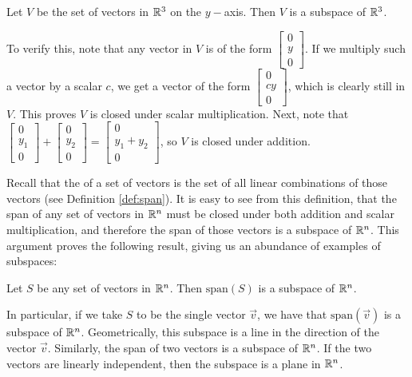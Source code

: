 \documentclass{ximera}
\begin{document}
\begin{example} \label{y-axis_subspace}
Let $V$ be the set of vectors in $\mathbb{R}^3$ on the $y-$axis.  Then $V$ is a subspace of $\mathbb{R}^3$.  

\begin{explanation}
To verify this, note that any vector in $V$ is of the form $\begin{bmatrix}0\\y\\0 \end{bmatrix}$.  If we multiply such a vector by a scalar $c$, we get a vector of the form $\begin{bmatrix}0\\cy\\0 \end{bmatrix}$, which is clearly still in $V$.  This proves $V$ is closed under scalar multiplication.  Next, note that $\begin{bmatrix}0\\y_1\\0 \end{bmatrix} + \begin{bmatrix}0\\y_2\\0 \end{bmatrix}= \begin{bmatrix}0\\y_1 + y_2\\0\end{bmatrix}$, so $V$ is closed under addition.
\end{explanation}
\end{example}


Recall that the  of a set of vectors is the set of all linear combinations of those vectors (see Definition \ref{def:span}).  It is easy to see from this definition, that the span of any set of vectors in $\mathbb{R}^n$ must be closed under both addition and scalar multiplication, and therefore the span of those vectors is a subspace of $\mathbb{R}^n$.  This argument proves the following result, giving us an abundance of examples of subspaces:

\begin{theorem} \label{th:span_is_subspace}
Let $S$ be any set of vectors in $\mathbb{R}^n$.  Then $\mbox{span}(S)$ is a subspace of $\mathbb{R}^n$.
\end{theorem}

In particular, if we take $S$ to be the single vector $\vec{v}$, we have that $\text{span}(\vec{v})$ is a subspace of $\mathbb{R}^n$.  Geometrically, this subspace is a line in the direction of the vector $\vec{v}$.  Similarly, the span of two vectors is a subspace of $\mathbb{R}^n$.  If the two vectors are linearly independent, then the subspace is a plane in $\mathbb{R}^n$. 
\end{document}
